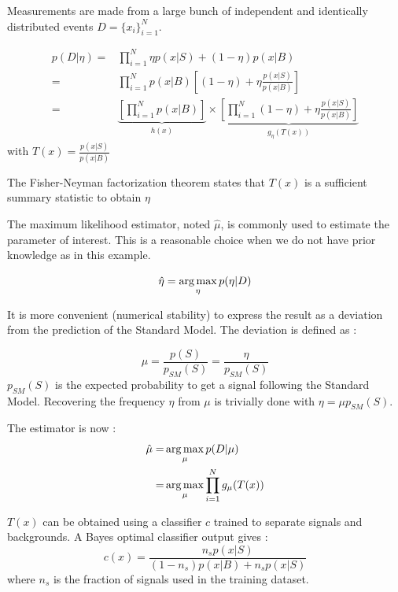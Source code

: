 Measurements are made from a large bunch of independent and identically distributed events $D=\{x_i\}_{i=1}^N$.

\begin{align}
	p(D|\eta) =& \prod_{i=1}^N \eta p(x|S) + (1-\eta) p(x|B) \\
	       =& \prod_{i=1}^N p(x|B) \left [(1-\eta) + \eta \frac{p(x|S)}{p(x|B)} \right ]\\
	       =& \underbrace{\left[ \prod_{i=1}^N p(x|B) \right ]}_{h(x)} \times 
	       \underbrace{\left [\prod_{i=1}^N (1-\eta) + \eta \frac{p(x|S)}{p(x|B)} \right ]}_{g_\eta(T(x))}
\label{eq:Fisher-Neyman}
\end{align}
with $T(x) = \frac{p(x|S)}{p(x|B)} $

The Fisher-Neyman factorization theorem \needcite states that $T(x)$ is a sufficient summary statistic to obtain $\eta$

The maximum likelihood estimator, noted $\hat \mu$, is commonly used to estimate the parameter of interest.
This is a reasonable choice when we do not have prior knowledge as in this example.

\begin{equation}
	\hat \eta = \operatorname*{arg\,max}_\eta p(\eta | D)
\end{equation}

It is more convenient (numerical stability) to express the result as a deviation from the prediction of the Standard Model.
The deviation is defined as :

\begin{equation}
	\mu = \frac{p(S)}{p_{SM}(S)} = \frac{\eta}{p_{SM}(S)}
\end{equation}
$p_{SM}(S)$ is the expected probability to get a signal following the Standard Model.
Recovering the frequency $\eta$ from $\mu$ is trivially done with $\eta = \mu p_{SM}(S)$.

The estimator is now :
\begin{align}
	\hat\mu =& \operatorname*{arg\,max}_\mu  p(D | \mu) \\
	     =& \operatorname*{arg\,max}_\mu  \prod_{i=1}^N g_\mu(T(x)) \\
\end{align}


$T(x)$ can be obtained using a classifier $c$ trained to separate signals and backgrounds.
A Bayes optimal classifier output gives :
\begin{equation}
	c(x) = \frac{n_s p(x|S)}{(1-n_s) p(x|B) + n_s p(x|S)}
\end{equation}
where $n_s$ is the fraction of signals used in the training dataset.


